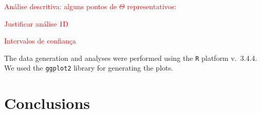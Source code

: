 \documentclass[sts]{imsart}
\begin{document}
\textcolor{red}{An\'alise descritiva: alguns pontos de $\Theta$ representativos:} 

\textcolor{red}{Justificar an\'alise 1D}

\textcolor{red}{Intervalos de confian\c ca}

The data generation and analyses were performed using the \texttt R platform \cite{Rmanual} v.~3.4.4.
We used the \texttt{ggplot2} library \cite{ggplot2Wickman} for generating the plots.

\section{Conclusions}\label{Sec:Conclusions}


\end{document}
